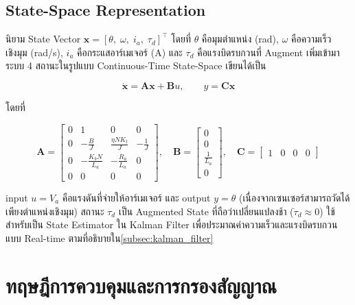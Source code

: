 \subsection{State-Space Representation}
\label{subsec:state_space}

นิยาม State Vector $\mathbf{x} = [\theta,\; \omega,\; i_a,\; \tau_d]^\top$
โดยที่ $\theta$ คือมุมตำแหน่ง (rad), $\omega$ คือความเร็วเชิงมุม (rad/s),
$i_a$ คือกระแสอาร์เมเจอร์ (A) และ $\tau_d$ คือแรงบิดรบกวนที่ Augment เพิ่มเข้ามา
ระบบ 4 สถานะในรูปแบบ Continuous-Time State-Space เขียนได้เป็น

\begin{equation}
    \dot{\mathbf{x}} = \mathbf{A}\mathbf{x} + \mathbf{B}u, \qquad
    y = \mathbf{C}\mathbf{x}
    \label{eq:state_space_ct}
\end{equation}

\noindent โดยที่

\begin{equation}
    \mathbf{A} = \begin{bmatrix}
        0 & 1 & 0 & 0 \\
        0 & -\tfrac{B}{J} & \tfrac{\eta N K_t}{J} & -\tfrac{1}{J} \\
        0 & -\tfrac{K_b N}{L_a} & -\tfrac{R_a}{L_a} & 0 \\
        0 & 0 & 0 & 0
    \end{bmatrix}, \quad
    \mathbf{B} = \begin{bmatrix} 0 \\ 0 \\ \tfrac{1}{L_a} \\ 0 \end{bmatrix}, \quad
    \mathbf{C} = \begin{bmatrix} 1 & 0 & 0 & 0 \end{bmatrix}
    \label{eq:ABCD_matrices}
\end{equation}

\noindent input $u = V_a$ คือแรงดันที่จ่ายให้อาร์เมเจอร์ และ output $y = \theta$ 
(เนื่องจากเซนเซอร์สามารถวัดได้เพียงตำแหน่งเชิงมุม)
สถานะ $\tau_d$ เป็น Augmented State ที่ถือว่าเปลี่ยนแปลงช้า ($\dot{\tau}_d \approx 0$)
ใช้สำหรับเป็น State Estimator ใน Kalman Filter เพื่อประมาณค่าความเร็วและแรงบิดรบกวนแบบ Real-time
ตามที่อธิบายใน\cref{subsec:kalman_filter}

\section{ทฤษฎีการควบคุมและการกรองสัญญาณ}
\label{sec:control_theory}

